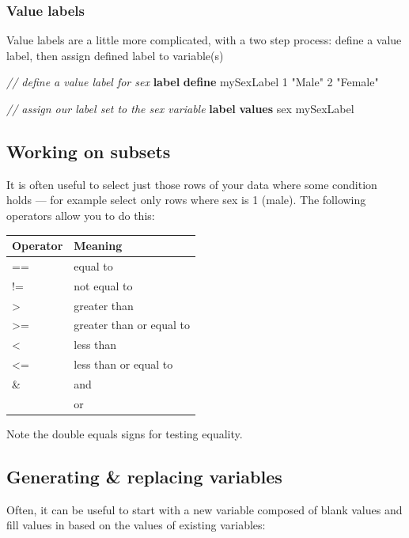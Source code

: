\documentclass[
]{book}
\newenvironment{Shaded}{\begin{snugshade}}{\end{snugshade}}
\newcommand{\CommentTok}[1]{\textcolor[rgb]{0.56,0.35,0.01}{\textit{#1}}}
\newcommand{\KeywordTok}[1]{\textcolor[rgb]{0.13,0.29,0.53}{\textbf{#1}}}
\newcommand{\NormalTok}[1]{#1}
\newcommand{\StringTok}[1]{\textcolor[rgb]{0.31,0.60,0.02}{#1}}
\begin{document}
\hypertarget{value-labels}{%
\subsubsection{Value labels}\label{value-labels}}

Value labels are a little more complicated, with a two step process: define a value label, then assign defined label to variable(s)

\begin{Shaded}
\begin{Highlighting}[]
\CommentTok{// define a value label for sex }
\KeywordTok{label} \KeywordTok{define}\NormalTok{ mySexLabel 1 }\StringTok{"Male"}\NormalTok{ 2 }\StringTok{"Female"}

\CommentTok{// assign our label set to the sex variable}
\KeywordTok{label} \KeywordTok{values}\NormalTok{ sex mySexLabel}
\end{Highlighting}
\end{Shaded}

\hypertarget{working-on-subsets}{%
\subsection{Working on subsets}\label{working-on-subsets}}

It is often useful to select just those rows of your data where some condition holds --- for example select only rows where sex is 1 (male). The following operators allow you to do this:

\begin{longtable}[]{@{}ll@{}}
\toprule
Operator & Meaning\tabularnewline
\midrule
\endhead
== & equal to\tabularnewline
!= & not equal to\tabularnewline
\textgreater{} & greater than\tabularnewline
\textgreater= & greater than or equal to\tabularnewline
\textless{} & less than\tabularnewline
\textless= & less than or equal to\tabularnewline
\& & and\tabularnewline
\textbar{} & or\tabularnewline
\bottomrule
\end{longtable}

Note the double equals signs for testing equality.

\hypertarget{generating-replacing-variables}{%
\subsection{Generating \& replacing variables}\label{generating-replacing-variables}}

Often, it can be useful to start with a new variable composed of blank values and fill values in based on the values of existing variables:
\end{document}
